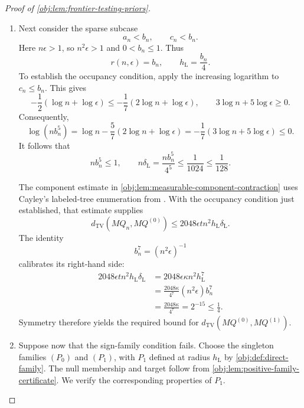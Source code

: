 \documentclass[11pt]{article}
\begin{document}
\begin{proof}[Proof of \cref{obj:lem:frontier-testing-priors}]
\begin{enumerate}
\item Next consider the sparse subcase
\[
a_n<b_n,\qquad c_n<b_n.
\]
Here \(n\epsilon>1\), so \(n^2\epsilon>1\) and \(0<b_n\le1\). Thus
\[
r(n,\epsilon)=b_n,\qquad h_{\mathrm L}=\frac{b_n}{4}.
\]
To establish the occupancy condition, apply the increasing logarithm to
\(c_n\le b_n\). This gives
\[
-\frac12(\log n+\log\epsilon)
\le-\frac17(2\log n+\log\epsilon),
\qquad
3\log n+5\log\epsilon\ge0.
\]
Consequently,
\[
\log(nb_n^5)
=\log n-\frac57(2\log n+\log\epsilon)
=-\frac17(3\log n+5\log\epsilon)
\le0.
\]
It follows that
\[
nb_n^5\le1,\qquad
n\delta_{\mathrm L}
=\frac{nb_n^5}{4^5}
\le\frac1{1024}\le\frac1{128}.
\]

The component estimate in
\cref{obj:lem:measurable-component-contraction} uses Cayley's labeled-tree
enumeration from
\citep[Section~5.6, Theorem~5.40]{KellerTrotterAppliedCombinatorics}.
With the occupancy condition just established, that estimate supplies
\[
d_{\mathrm{TV}}(MQ_n,MQ^{(0)})
\le2048\epsilon t n^2h_{\mathrm L}\delta_{\mathrm L}.
\]
The identity
\[
b_n^7=(n^2\epsilon)^{-1}
\]
calibrates its right-hand side:
\[
\begin{aligned}
2048\epsilon t n^2h_{\mathrm L}\delta_{\mathrm L}
&=2048\epsilon\kappa n^2h_{\mathrm L}^{7}\\
&=\frac{2048\kappa}{4^7}(n^2\epsilon)b_n^7\\
&=\frac{2048\kappa}{4^7}
 =2^{-15}\le\frac14.
\end{aligned}
\]
Symmetry therefore yields the required bound for
\(d_{\mathrm{TV}}(MQ^{(0)},MQ^{(1)})\).

\item Suppose now that the sign-family condition fails. Choose the singleton
families \((P_0)\) and \((P_1)\), with \(P_1\) defined at radius
\(h_{\mathrm L}\) by \cref{obj:def:direct-family}. The null membership and
target follow from \cref{obj:lem:positive-family-certificate}. We verify
the corresponding properties of \(P_1\).


\end{enumerate}
\end{proof}
\end{document}
